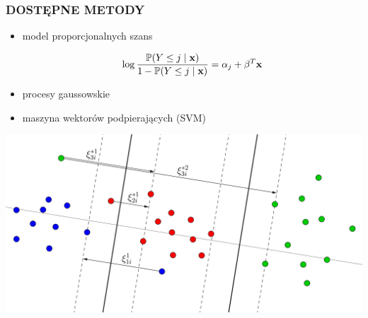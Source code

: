 \documentclass[11pt,usenames,dvipsnames,rgb,svgnames,x11names]{beamer}
\theoremstyle{plain}
\theoremstyle{definition}
\theoremstyle{remark}
\begin{document}
\begin{frame}
\frametitle{\textbf{DOSTĘPNE METODY}}
\begin{itemize}

\item model proporcjonalnych szans

$$
\log\dfrac{\mathbb{P}(Y\leq j \hspace{1mm}|\hspace{1mm} \mathbf{x})}{1-\mathbb{P}(Y\leq j \hspace{1mm}|\hspace{1mm} \mathbf{x})} = \alpha_j+\mathbf{\beta}^T\mathbf{x}
$$
\item procesy gaussowskie
\end{itemize}
\end{frame}

\begin{frame}
\begin{itemize}
\item maszyna wektorów podpierających (SVM)
\end{itemize}
\vspace{4mm}
\includegraphics[scale=0.3]{svm3_dobre.png}
\end{frame}
\end{document}
